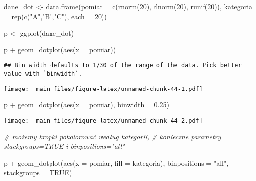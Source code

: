 \documentclass[
]{book}
\newenvironment{Shaded}{\begin{snugshade}}{\end{snugshade}}
\newcommand{\AttributeTok}[1]{\textcolor[rgb]{0.77,0.63,0.00}{#1}}
\newcommand{\CommentTok}[1]{\textcolor[rgb]{0.56,0.35,0.01}{\textit{#1}}}
\newcommand{\ConstantTok}[1]{\textcolor[rgb]{0.00,0.00,0.00}{#1}}
\newcommand{\DecValTok}[1]{\textcolor[rgb]{0.00,0.00,0.81}{#1}}
\newcommand{\FloatTok}[1]{\textcolor[rgb]{0.00,0.00,0.81}{#1}}
\newcommand{\FunctionTok}[1]{\textcolor[rgb]{0.00,0.00,0.00}{#1}}
\newcommand{\NormalTok}[1]{#1}
\newcommand{\OtherTok}[1]{\textcolor[rgb]{0.56,0.35,0.01}{#1}}
\newcommand{\SpecialCharTok}[1]{\textcolor[rgb]{0.00,0.00,0.00}{#1}}
\newcommand{\StringTok}[1]{\textcolor[rgb]{0.31,0.60,0.02}{#1}}
\begin{document}
\begin{Shaded}
\begin{Highlighting}[]
\NormalTok{dane\_dot }\OtherTok{\textless{}{-}} \FunctionTok{data.frame}\NormalTok{(}\AttributeTok{pomiar =} \FunctionTok{c}\NormalTok{(}\FunctionTok{rnorm}\NormalTok{(}\DecValTok{20}\NormalTok{), }\FunctionTok{rlnorm}\NormalTok{(}\DecValTok{20}\NormalTok{), }\FunctionTok{runif}\NormalTok{(}\DecValTok{20}\NormalTok{)), }
                       \AttributeTok{kategoria =} \FunctionTok{rep}\NormalTok{(}\FunctionTok{c}\NormalTok{(}\StringTok{"A"}\NormalTok{,}\StringTok{"B"}\NormalTok{,}\StringTok{"C"}\NormalTok{), }\AttributeTok{each =} \DecValTok{20}\NormalTok{))}

\NormalTok{p }\OtherTok{\textless{}{-}} \FunctionTok{ggplot}\NormalTok{(dane\_dot)}

\NormalTok{p }\SpecialCharTok{+} \FunctionTok{geom\_dotplot}\NormalTok{(}\FunctionTok{aes}\NormalTok{(}\AttributeTok{x =}\NormalTok{ pomiar))}
\end{Highlighting}
\end{Shaded}

\begin{verbatim}
## Bin width defaults to 1/30 of the range of the data. Pick better value with `binwidth`.
\end{verbatim}

\texttt{[image: \_main\_files/figure-latex/unnamed-chunk-44-1.pdf]}

\begin{Shaded}
\begin{Highlighting}[]
\NormalTok{p }\SpecialCharTok{+} \FunctionTok{geom\_dotplot}\NormalTok{(}\FunctionTok{aes}\NormalTok{(}\AttributeTok{x =}\NormalTok{ pomiar), }\AttributeTok{binwidth =} \FloatTok{0.25}\NormalTok{)}
\end{Highlighting}
\end{Shaded}

\texttt{[image: \_main\_files/figure-latex/unnamed-chunk-44-2.pdf]}

\begin{Shaded}
\begin{Highlighting}[]
\CommentTok{\# możemy kropki pokolorować według kategorii, }
\CommentTok{\# konieczne parametry stackgroups=TRUE i binpositions="all"}

\NormalTok{p }\SpecialCharTok{+} \FunctionTok{geom\_dotplot}\NormalTok{(}\FunctionTok{aes}\NormalTok{(}\AttributeTok{x =}\NormalTok{ pomiar, }\AttributeTok{fill =}\NormalTok{ kategoria), }\AttributeTok{binpositions =} \StringTok{"all"}\NormalTok{, }\AttributeTok{stackgroups =} \ConstantTok{TRUE}\NormalTok{)}
\end{Highlighting}
\end{Shaded}
\end{document}
